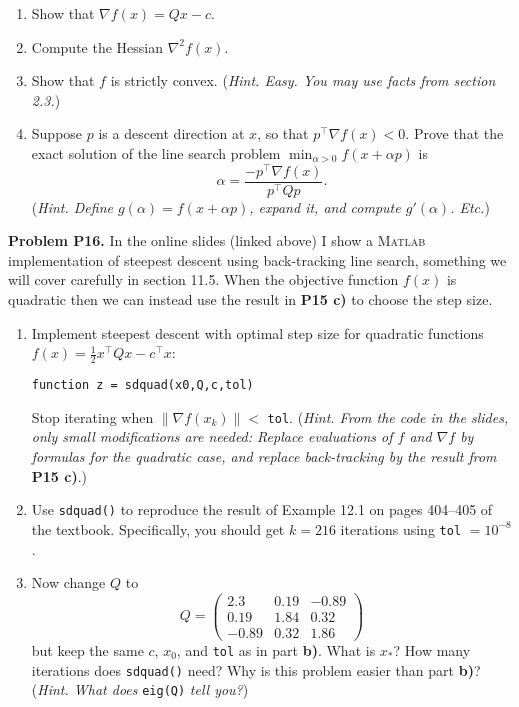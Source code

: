 \documentclass[12pt]{amsart}
\newcommand{\grad}{\nabla}
\newcommand{\Matlab}{\textsc{Matlab}\xspace}
\newcommand{\prob}[1]{\bigskip\noindent\textbf{#1}\quad }
\begin{document}
\medskip
\renewcommand{\labelenumi}{\textbf{\alph{enumi})}}
\begin{enumerate}
\item Show that $\grad f(x) = Q x - c$.
\item Compute the Hessian $\grad^2 f(x)$.
\item Show that $f$ is strictly convex.  (\emph{Hint.  Easy.  You may use facts from section 2.3.})
\item Suppose $p$ is a descent direction at $x$, so that $p^\top \grad f(x)<0$.  Prove that the exact solution of the line search problem $\min_{\alpha>0} f(x+\alpha p)$ is
    $$\alpha = \frac{-p^\top \grad f(x)}{p^\top Q p}.$$
(\emph{Hint.  Define $g(\alpha)=f(x+\alpha p)$, expand it, and compute $g'(\alpha)$. Etc.})
\end{enumerate}


\prob{Problem P16.}  In the online slides (linked above) I show a \Matlab implementation of steepest descent using back-tracking line search, something we will cover carefully in section 11.5.  When the objective function $f(x)$ is quadratic then we can instead use the result in \textbf{P15 c)} to choose the step size.
\begin{enumerate}
\item Implement steepest descent with optimal step size for quadratic functions $f(x) = \frac{1}{2} x^\top Q x - c^\top x$:

\centerline{\texttt{function z = sdquad(x0,Q,c,tol)}}

\noindent Stop iterating when $\|\grad f(x_k)\| < $ \texttt{tol}.  (\emph{Hint.  From the code in the slides, only small modifications are needed:  Replace evaluations of $f$ and $\grad f$ by formulas for the quadratic case, and replace back-tracking by the result from }\textbf{P15 c)}.)
\item Use \texttt{sdquad()} to reproduce the result of Example 12.1 on pages 404--405 of the textbook.  Specifically, you should get $k=216$ iterations using \texttt{tol} $=10^{-8}$.
\item Now change $Q$ to
    $$Q = \begin{pmatrix}
    2.3   &  0.19 & -0.89 \\
    0.19  &  1.84 &  0.32 \\
    -0.89 &  0.32 &  1.86
    \end{pmatrix}$$
but keep the same $c$, $x_0$, and \texttt{tol} as in part \textbf{b)}.  What is $x_*$?  How many iterations does \texttt{sdquad()} need?  Why is this problem easier than part \textbf{b)}?  (\emph{Hint.  What does} \texttt{eig(Q)} \emph{tell you?})
\end{enumerate}
\end{document}
